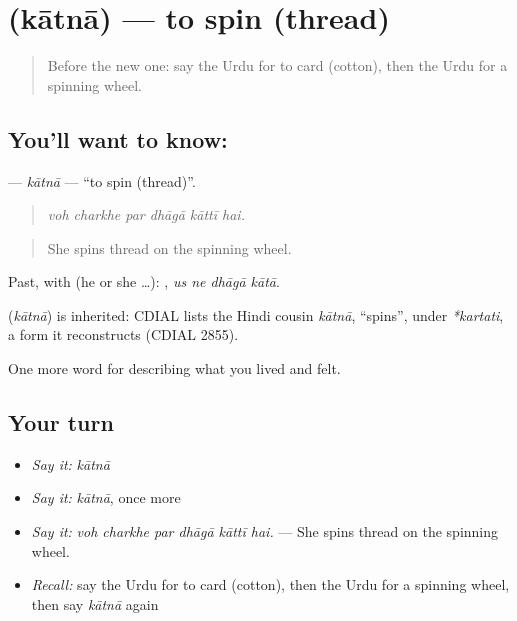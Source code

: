 \section[\texorpdfstring{\ur{کاتنا} (kātnā)}{کاتنا (kātnā)}]{ (kātnā) — to spin (thread)}

\label{lesson:UR-C499-katna-spin}



\begin{quote}
Before the new one: say the Urdu for to card (cotton), then the Urdu for a spinning wheel.
\end{quote}

\subsection*{You'll want to know: }
\textbf{} — \emph{kātnā} — \textquotedblleft{}to spin (thread)\textquotedblright{}.

\begin{quote}
     
\end{quote}

\begin{quote}
\emph{voh charkhe par dhāgā kāttī hai.}
\end{quote}

\begin{quote}
She spins thread on the spinning wheel.
\end{quote}

Past, with  (he or she …):    , \emph{us ne dhāgā kātā}.

\begin{cousinweb}
\textbf{} (\emph{kātnā}) is inherited: CDIAL lists the Hindi cousin \emph{kātnā}, \textquotedblleft{}spins\textquotedblright{}, under \emph{*kartati}, a form it reconstructs (CDIAL 2855).
\end{cousinweb}

\begin{grammarlens}[title={What you've built}]
One more word for describing what you lived and felt.
\end{grammarlens}

\subsection*{Your turn}
\begin{itemize}
\raggedright
  \item \emph{Say it:} \emph{kātnā}
  \item \emph{Say it:} \emph{kātnā}, once more
  \item \emph{Say it:} \emph{voh charkhe par dhāgā kāttī hai.} — She spins thread on the spinning wheel.
  \item \emph{Recall:} say the Urdu for to card (cotton), then the Urdu for a spinning wheel, then say \emph{kātnā} again
\end{itemize}

